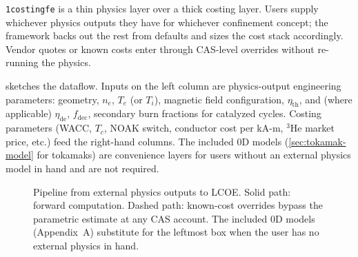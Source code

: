 \documentclass{article}
\begin{document}
\texttt{1costingfe} is a thin physics layer over a thick costing
layer. Users supply whichever physics outputs they have for whichever
confinement concept; the framework backs out the rest from defaults
and sizes the cost stack accordingly. Vendor quotes or known costs
enter through CAS-level overrides without re-running the physics.

 sketches the dataflow. Inputs on the left
column are physics-output engineering parameters: geometry,
$n_e$, $T_e$ (or $T_i$), magnetic field configuration,
$\eta_{\text{th}}$, and (where applicable) $\eta_{\text{de}}$,
$f_{\text{dec}}$, secondary burn fractions for catalyzed cycles.
Costing parameters (WACC, $T_c$, NOAK switch, conductor cost per
kA-m, ${}^3$He market price, etc.) feed the right-hand columns.
The included 0D models (\cref{sec:tokamak-model} for tokamaks) are
convenience layers for users without an external physics model in
hand and are not required.

\begin{figure}[htbp]
\centering
{}
\caption{Pipeline from external physics outputs to LCOE. Solid path:
forward computation. Dashed path: known-cost overrides bypass the
parametric estimate at any CAS account. The included 0D models
(Appendix~A) substitute for the leftmost box when the user has no
external physics in hand.}
\label{fig:pipeline}
\end{figure}
\end{document}
